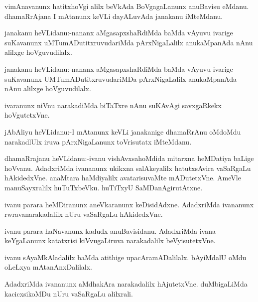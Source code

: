 \documentclass{article}
\begin{document}
\begin{mn}%
vimAnavanunx hatitxhoVgi alilx beVkAda BoVgagaLanunx anuBavisu eMdanu. dhamaRrAjana I 
mAtanunx keVLi dayALuvAda janakanu iMteMdanu.
\end{mn}

\begin{mn}%
janakanu heVLidanu:-nananx aMgasapxshaRdiMda baMda vAyuvu ivarige suKavanunx 
uMTumADutitxruvudariMda pArxNigaLalilx anukaMpanAda nAnu alilxge hoVguvudilalx.
\end{mn}

\begin{mn}%
janakanu heVLidanu:-nananx aMgasapxshaRdiMda baMda vAyuvu ivarige suKavanunx 
UMTumADutitxruvudariMDa pArxNigaLalilx anukaMpanAda nAnu alilxge hoVguvudilalx.
\end{mn}

\begin{mn}%
ivaranunx niVnu narakadiMda biTaTxre nAnu suKAvAgi savxgaRkekx hoVgutetxVne.
\end{mn}

\begin{mn}%
jAbAliyu heVLidanu:-I mAtanunx keVLi janakanige dhamaRrAnu oMdoMdu narakadlUlx iruva 
pArxNigaLanunx toVrisutatx iMteMdanu.
\end{mn}

\begin{mn}%
dhamaRrajanu heVLidanu:-ivanu vishAvxsahoMdida mitarxna heMDatiya baLige hoVvanu. AdadxriMda 
ivananunx ukikxna salAkeyalilx hatutxsAvira vaSaRgaLu hAkidedxVne. anaMtara haMdiyalilx 
avatarisuvaMte mADutetxVne. AmeVle manuSayxralilx huTuTxbeVku. huTiTxyU SaMDanAgirutAtxne.
\end{mn}

\begin{mn}%
ivanu parara heMDiranunx aneVkaranunx keDisidAdxne. AdadxriMda ivananunx 
rwravanarakadalilx nUru vaSaRgaLu hAkidedxVne.
\end{mn}

\begin{mn}%
ivanu parara haNavanunx kadudx anuBavisidanu. AdadxriMda ivana keYgaLanunx katatxrisi 
kiVvugaLiruva narakadalilx beVyisutetxVne.
\end{mn}

\begin{mn}%
ivanu sAyaMkAladalilx baMda atithige upacAramADalilalx. bAyiMdalU oMdu oLeLxya 
mAtanAnxDalilalx.
\end{mn}

\begin{mn}%
AdadxriMda ivananunx aMdhakAra narakadalilx hAjutetxVne. duMbigaLiMda kacicxsikoMDu nUru 
vaSaRgaLu alilxrali.
\end{mn}
\end{document}
